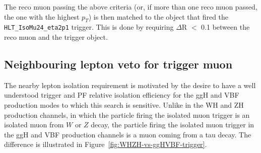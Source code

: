 The reco muon passing the above criteria (or, if more than one reco muon passed, the one with the highest $p_T$) is then matched to the object that fired the \texttt{HLT\_IsoMu24\_eta2p1} trigger. This is done by requiring $\Delta$R $<$ 0.1 between the reco muon and the trigger object.

\subsection{Neighbouring lepton veto for trigger muon\label{sec:evtsel-leptonveto}}

The nearby lepton isolation requirement is motivated by the desire to have a well understood trigger and PF relative isolation efficiency for the ggH and VBF production modes to which this search is sensitive.  Unlike in the WH and ZH production channels, in which the particle firing the isolated muon trigger is an isolated muon from $W$ or $Z$ decay, the particle firing the isolated muon trigger in the ggH and VBF production channels is a muon coming from a tau decay.  The difference is illustrated in Figure~\ref{fig:WHZH-vs-ggHVBF-trigger}.

